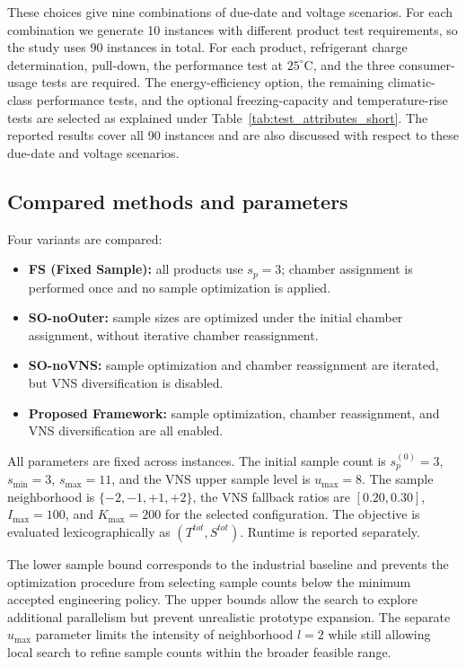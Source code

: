 \documentclass[11pt]{article}
\begin{document}
These choices give nine combinations of due-date and voltage scenarios. For each combination we generate 10 instances with different product test requirements, so the study uses 90 instances in total. For each product, refrigerant charge determination, pull-down, the performance test at \(25^\circ\mathrm{C}\), and the three consumer-usage tests are required. The energy-efficiency option, the remaining climatic-class performance tests, and the optional freezing-capacity and temperature-rise tests are selected as explained under Table~\ref{tab:test_attributes_short}. The reported results cover all 90 instances and are also discussed with respect to these due-date and voltage scenarios.

\subsection{Compared methods and parameters}
\label{subsec:methods_params}

Four variants are compared:
\begin{itemize}
    \item \textbf{FS (Fixed Sample):} all products use \(s_p=3\); chamber assignment is performed once and no sample optimization is applied.
    \item \textbf{SO-noOuter:} sample sizes are optimized under the initial chamber assignment, without iterative chamber reassignment.
    \item \textbf{SO-noVNS:} sample optimization and chamber reassignment are iterated, but VNS diversification is disabled.
    \item \textbf{Proposed Framework:} sample optimization, chamber reassignment, and VNS diversification are all enabled.
\end{itemize}

All parameters are fixed across instances. The initial sample count is \(s_p^{(0)}=3\), \(s_{\min}=3\), \(s_{\max}=11\), and the VNS upper sample level is \(u_{\max}=8\). The sample neighborhood is \(\{-2,-1,+1,+2\}\), the VNS fallback ratios are \([0.20,0.30]\), \(I_{\max}=100\), and \(K_{\max}=200\) for the selected configuration. The objective is evaluated lexicographically as \((T^{tot},S^{tot})\). Runtime is reported separately.

The lower sample bound corresponds to the industrial baseline and prevents the optimization procedure from selecting sample counts below the minimum accepted engineering policy. The upper bounds allow the search to explore additional parallelism but prevent unrealistic prototype expansion. The separate \(u_{\max}\) parameter limits the intensity of neighborhood \(l=2\) while still allowing local search to refine sample counts within the broader feasible range.
\end{document}
